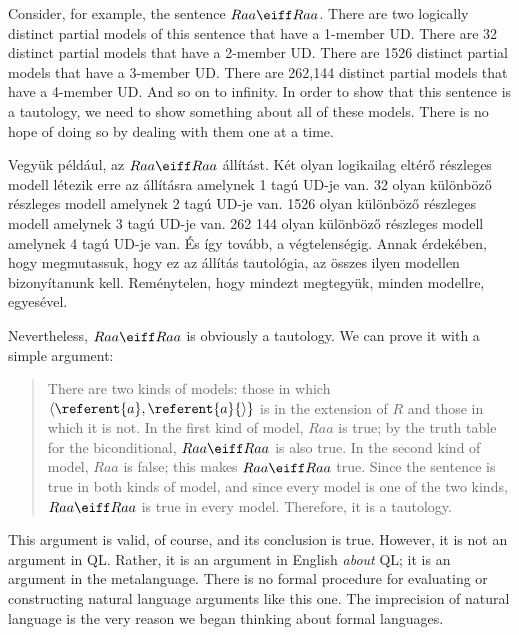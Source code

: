 Consider, for example, the sentence $Raa\eiff Raa$. There are two logically distinct partial models of this sentence that have a 1-member UD. There are 32 distinct partial models that have a 2-member UD. There are 1526 distinct partial models that have a 3-member UD. There are 262,144 distinct partial models that have a 4-member UD. And so on to infinity. In order to show that this sentence is a tautology, we need to show something about all of these models. There is no hope of doing so by dealing with them one at a time.

Vegyük például, az $Raa\eiff Raa$ állítást. Két olyan logikailag eltérő részleges modell létezik erre az állításra amelynek 1 tagú UD-je van. 32 olyan különböző részleges modell amelynek 2 tagú UD-je van. 1526 olyan különböző részleges modell amelynek 3 tagú UD-je van. 262 144 olyan különböző részleges modell amelynek 4 tagú UD-je van. És így tovább, a végtelenségig. Annak érdekében, hogy megmutassuk, hogy ez az állítás tautológia, az összes ilyen modellen bizonyítanunk kell. Reménytelen, hogy mindezt megtegyük, minden modellre, egyesével.

Nevertheless, $Raa\eiff Raa$ is obviously a tautology. We can prove it with a simple argument:
\begin{quote}
\label{allmodels1}
There are two kinds of models: those in which ${\langle}\referent{a},\referent{a}{\rangle}$ is in the extension of $R$ and those in which it is not. In the first kind of model, $Raa$ is true; by the truth table for the biconditional, $Raa\eiff Raa$ is also true. In the second kind of model, $Raa$ is false; this makes $Raa\eiff Raa$ true. Since the sentence is true in both kinds of model, and since every model is one of the two kinds, $Raa\eiff Raa$ is true in every model. Therefore, it is a tautology.
\end{quote}
This argument is valid, of course, and its conclusion is true. However, it is not an argument in QL. Rather, it is an argument in English \emph{about} QL; it is an argument in the metalanguage. There is no formal procedure for evaluating or constructing natural language arguments like this one. The imprecision of natural language is the very reason we began thinking about formal languages.

